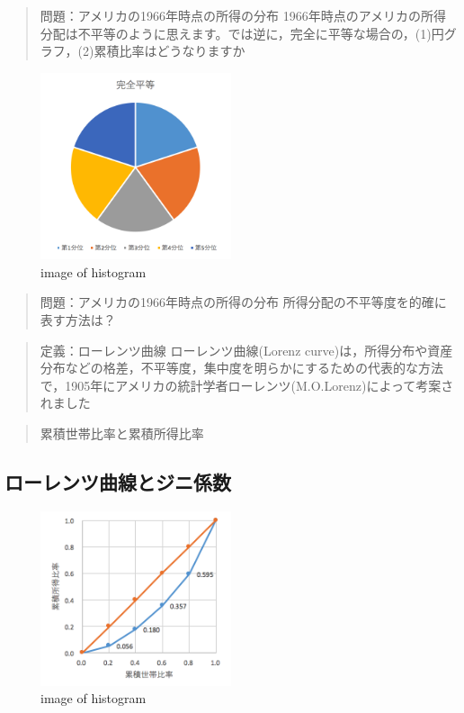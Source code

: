 \documentclass[
]{book}
\theoremstyle{definition}
\theoremstyle{definition}
\theoremstyle{definition}
\theoremstyle{definition}
\theoremstyle{remark}
\begin{document}
\begin{quote}
問題：アメリカの1966年時点の所得の分布
1966年時点のアメリカの所得分配は不平等のように思えます。では逆に，完全に平等な場合の，(1)円グラフ，(2)累積比率はどうなりますか
\end{quote}

\begin{figure}
\centering
\includegraphics[width=0.5\textwidth,height=\textheight]{images/lec03/fig_income_dist_perfectly_equal.png}
\caption{image of histogram}
\end{figure}

\begin{quote}
問題：アメリカの1966年時点の所得の分布
所得分配の不平等度を的確に表す方法は？
\end{quote}

\begin{quote}
定義：ローレンツ曲線
ローレンツ曲線(Lorenz curve)は，所得分布や資産分布などの格差，不平等度，集中度を明らかにするための代表的な方法で，1905年にアメリカの統計学者ローレンツ(M.O.Lorenz)によって考案されました
\end{quote}

\begin{quote}
累積世帯比率と累積所得比率
\end{quote}

\hypertarget{ux30edux30fcux30ecux30f3ux30c4ux66f2ux7ddaux3068ux30b8ux30cbux4fc2ux6570}{%
\subsection{ローレンツ曲線とジニ係数}\label{ux30edux30fcux30ecux30f3ux30c4ux66f2ux7ddaux3068ux30b8ux30cbux4fc2ux6570}}

\begin{figure}
\centering
\includegraphics[width=0.5\textwidth,height=\textheight]{images/lec03/fig_us_lorenz1966.png}
\caption{image of histogram}
\end{figure}
\end{document}
